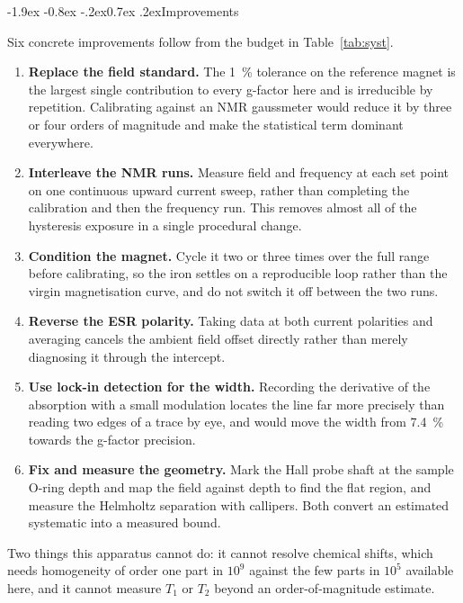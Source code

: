 \documentclass[11pt,a4paper]{article}
\makeatletter
\renewcommand\subsection{\@startsection{subsection}{2}{\z@}%
  {-1.9ex \@plus -0.8ex \@minus -.2ex}{0.7ex \@plus .2ex}{\normalfont\normalsize\bfseries}}
\makeatother
\begin{document}
\subsection{Improvements}

Six concrete improvements follow from the budget in Table~\ref{tab:syst}.

\begin{enumerate}\setlength{\itemsep}{0pt}\setlength{\parskip}{0pt}
\item \textbf{Replace the field standard.} The \SI{1}{\percent} tolerance on the reference magnet
is the largest single contribution to every g-factor here and is irreducible by repetition.
Calibrating against an NMR gaussmeter would reduce it by three or four orders of magnitude and
make the statistical term dominant everywhere.
\item \textbf{Interleave the NMR runs.} Measure field and frequency at each set point on one
continuous upward current sweep, rather than completing the calibration and then the frequency
run. This removes almost all of the hysteresis exposure in a single procedural change.
\item \textbf{Condition the magnet.} Cycle it two or three times over the full range before
calibrating, so the iron settles on a reproducible loop rather than the virgin magnetisation
curve, and do not switch it off between the two runs.
\item \textbf{Reverse the ESR polarity.} Taking data at both current polarities and averaging
cancels the ambient field offset directly rather than merely diagnosing it through the intercept.
\item \textbf{Use lock-in detection for the width.} Recording the derivative of the absorption
with a small modulation locates the line far more precisely than reading two edges of a trace by
eye, and would move the width from \SI{7.4}{\percent} towards the g-factor precision.
\item \textbf{Fix and measure the geometry.} Mark the Hall probe shaft at the sample O-ring depth
and map the field against depth to find the flat region, and measure the Helmholtz separation with
callipers. Both convert an estimated systematic into a measured bound.
\end{enumerate}

Two things this apparatus cannot do: it cannot resolve chemical
shifts, which needs homogeneity of order one part in $10^{9}$ against the few parts in $10^{5}$
available here, and it cannot measure $T_1$ or $T_2$ beyond an order-of-magnitude estimate.
\end{document}
